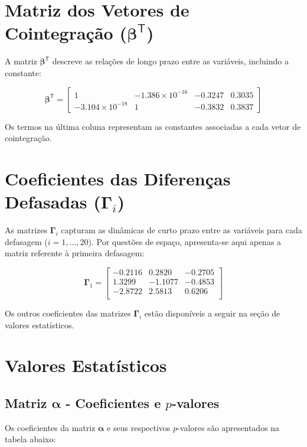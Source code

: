 \documentclass[a4paper, 12pt, openany, oneside, brazil]{abntex2}
\begin{document}
\begin{apendicesenv}
\section{Matriz dos Vetores de Cointegração (\(\mathbf{\beta}^\mathsf{T}\))}
A matriz \(\mathbf{\beta}^\mathsf{T}\) descreve as relações de longo prazo entre as variáveis, incluindo a constante:

\[
	\mathbf{\beta}^\mathsf{T} =
	\begin{bmatrix}
		1 & -1.386 \times 10^{-16} & -0.3247 & 0.3035 \\
		-3.104 \times 10^{-18} & 1 & -0.3832 & 0.3837
	\end{bmatrix}
\]

Os termos na última coluna representam as constantes associadas a cada vetor de cointegração.

\section{Coeficientes das Diferenças Defasadas ($\mathbf{\Gamma}_i$)}
As matrizes \(\mathbf{\Gamma}_i\) capturam as dinâmicas de curto prazo entre as variáveis para cada defasagem (\(i = 1, \dots, 20\)). Por questões de espaço, apresenta-se aqui apenas a matriz referente à primeira defasagem:

\[
	\mathbf{\Gamma}_1 =
	\begin{bmatrix}
		-0.2116 &  0.2820 & -0.2705 \\
		1.3299 & -1.1077 & -0.4853 \\
		-2.8722 &  2.5813 &  0.6206 \\
	\end{bmatrix}
\]

Os outros coeficientes das matrizes $\mathbf{\Gamma}_i$ estão disponíveis a seguir na seção de valores estatísticos.

\section{Valores Estatísticos}

\subsection{Matriz $\mathbf{\alpha}$ - Coeficientes e $p$-valores}

Os coeficientes da matriz $\mathbf{\alpha}$ e seus respectivos \(p\)-valores são apresentados na tabela abaixo:


\end{apendicesenv}
\end{document}
